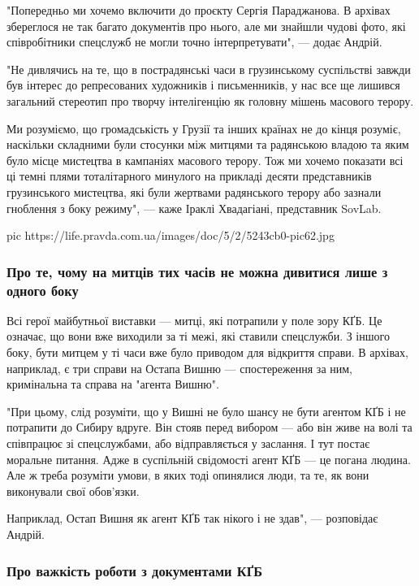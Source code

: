 "Попередньо ми хочемо включити до проєкту Сергія Параджанова. В архівах
збереглося не так багато документів про нього, але ми знайшли чудові фото, які
співробітники спецслужб не могли точно інтерпретувати", — додає Андрій.

"Не дивлячись на те, що в пострадянські часи в грузинському суспільстві завжди
був інтерес до репресованих художників і письменників, у нас все ще лишився
загальний стереотип про творчу інтелігенцію як головну мішень масового терору. 

Ми розуміємо, що громадськість у Грузії та інших країнах не до кінця розуміє,
наскільки складними були стосунки між митцями та радянською владою та яким було
місце мистецтва в кампаніях масового терору. Тож ми хочемо показати всі ці
темні плями тоталітарного минулого на прикладі десяти представників
грузинського мистецтва, які були жертвами радянського терору або зазнали
гноблення з боку режиму", — каже Іраклі Хвадагіані, представник SovLab.

\ifcmt
pic https://life.pravda.com.ua/images/doc/5/2/5243cb0-pic62.jpg
\fi

\subsubsection{Про те, чому на митців тих часів не можна дивитися лише з одного боку}

Всі герої майбутньої виставки — митці, які потрапили у поле зору КҐБ. Це
означає, що вони вже виходили за ті межі, які ставили спецслужби. З іншого
боку, бути митцем у ті часи вже було приводом для відкриття справи. В архівах,
наприклад, є три справи на Остапа Вишню — спостереження за ним, кримінальна та
справа на "агента Вишню". 

"При цьому, слід розуміти, що у Вишні не було шансу не бути агентом КҐБ і не
потрапити до Сибиру вдруге. Він стояв перед вибором — або він живе на волі та
співпрацює зі спецслужбами, або відправляється у заслання. І тут постає
моральне питання. Адже в суспільній свідомості агент КҐБ — це погана людина.
Але ж треба розуміти умови, в яких тоді опинялися люди, та те, як вони
виконували свої обов'язки. 

Наприклад, Остап Вишня як агент КҐБ так нікого і не здав", — розповідає Андрій.

\subsubsection{Про важкість роботи з документами КҐБ}

